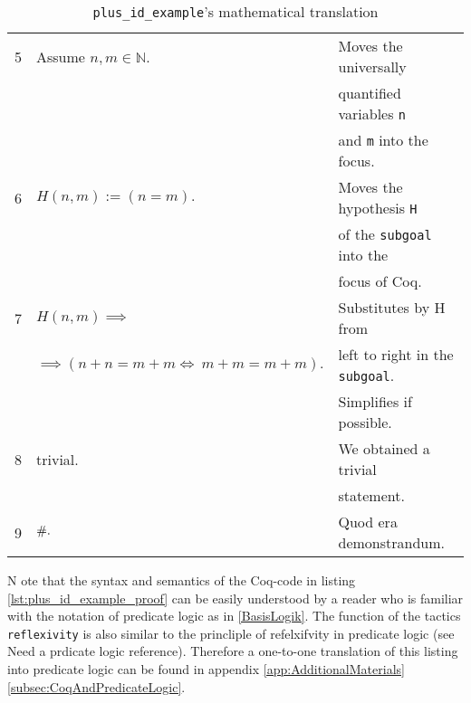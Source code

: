 \begin{table}[h]
\begin{center}
\begin{tabular}{|c|l|l|}
	          5         & Assume $n,m \in \mathbb{N}.$        & Moves the universally     \\
	                    &                                     & quantified  variables \lstinline!n!      \\   
	                    &                                     & and \lstinline!m! into the focus.\\     \hline  
	          6         & $H(n,m) :=(n=m).$                 & Moves the hypothesis \lstinline!H! \\ 
	    	                &                                     & of the \lstinline!subgoal! into the    \\   
	    	                &                                     & focus of Coq.\\ \hline 
	          7         & $H(n,m)\implies $                   & Substitutes by H from \\  
	     	            & $\implies( n+n = m+m \Leftrightarrow\ m+m = m+m).$
	     	                    	                              & left to right in the \lstinline!subgoal!.\\
                        &     	                              & Simplifies if possible. \\ \hline
	     	  8         & trivial.                             & We obtained a trivial                 \\ 
	     	            &                                      &  statement. \\ \hline
	    	      9        & $\qed.$                               &  Quod era demonstrandum.  \\  \hline
	    	   	 \end{tabular}
	    	   	   \caption{\lstinline!plus_id_example!'s mathematical translation}
	    	   	   \label{tab:aMathematicalTranslation}  
	         \end{center}          
          \end{table}  
       N	ote that the syntax and semantics of the Coq-code in listing \ref{lst:plus_id_example_proof} can be easily understood by a reader who is familiar with the notation of predicate logic as in \ref{BasisLogik}. 
       The function of the tactics \lstinline!reflexivity! is also similar to the princliple of refelxifvity in predicate logic (see  Need a prdicate logic reference). 
       Therefore a one-to-one translation of this listing into predicate logic can be found in appendix \ref{app:AdditionalMaterials} \ref{subsec:CoqAndPredicateLogic}.  \\      
         
